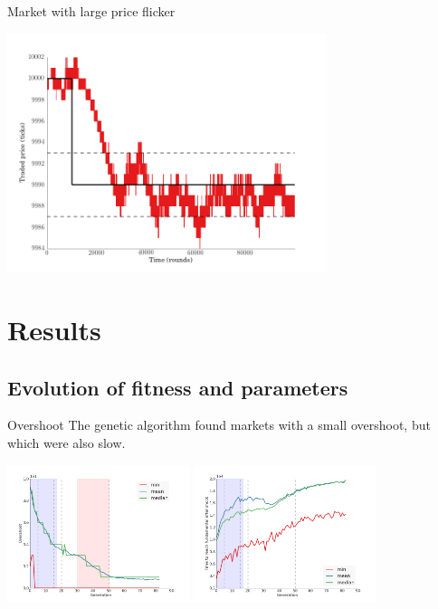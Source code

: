 \documentclass[14pt]{beamer}
\begin{document}
\begin{frame}{Market with large price flicker}
\begin{center}
\includegraphics[width=0.7\textwidth]{market_cases/b_flicker_but_mostly_within_margin.png}
\end{center}
\end{frame}





	
\section{Results}

\subsection{Evolution of fitness and parameters}
\begin{frame}
\tableofcontents[currentsection]
\end{frame}

\begin{frame}{Overshoot}
The genetic algorithm found markets with a small overshoot, but which were also slow.
\begin{center}
\includegraphics[width=0.4\textwidth]{evolution/overshoot.png}
\includegraphics[width=0.4\textwidth]{evolution/time_to_reach_new_fundamental.png}
\end{center}
\end{frame}
\end{document}
